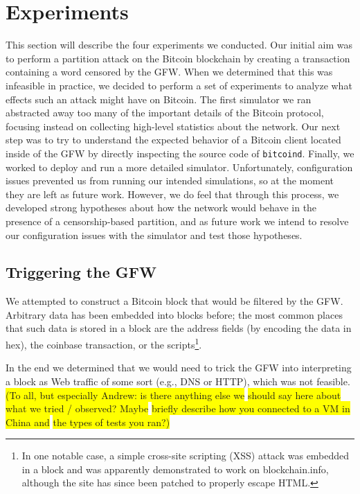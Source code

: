 \section{Experiments}
This section will describe the four experiments we conducted. Our initial aim was to perform a partition attack on the Bitcoin blockchain by creating a transaction containing a word censored by the GFW. When we determined that this was infeasible in practice, we decided to perform a set of experiments to analyze what effects such an attack might have on Bitcoin. The first simulator we ran abstracted away too many of the important details of the Bitcoin protocol, focusing instead on collecting high-level statistics about the network. Our next step was to try to understand the expected behavior of a Bitcoin client located inside of the GFW by directly inspecting the source code of \texttt{bitcoind}. Finally, we worked to deploy and run a more detailed simulator. Unfortunately, configuration issues prevented us from running our intended simulations, so at the moment they are left as future work. However, we do feel that through this process, we developed strong hypotheses about how the network would behave in the presence of a censorship-based partition, and as future work we intend to resolve our configuration issues with the simulator and test those hypotheses.

\subsection{Triggering the GFW}
We attempted to construct a Bitcoin block that would be filtered by the GFW. Arbitrary data has been embedded into blocks before; the most common places that such data is stored in a block are the address fields (by encoding the data in hex), the coinbase transaction, or the scripts\footnote{In one notable case, a simple cross-site scripting (XSS) attack was embedded in a block and was apparently demonstrated to work on blockchain.info\cite{reddit}, although the site has since been patched to properly escape HTML.}. 

In the end we determined that we would need to trick the GFW into interpreting a block as Web traffic of some sort (e.g., DNS or HTTP), which was not feasible.
\colorbox{yellow}{(To all, but especially Andrew: is there anything else we}
\colorbox{yellow}{should say here about what we tried / observed? Maybe}
\colorbox{yellow}{briefly describe how you connected to a VM in China and}
\colorbox{yellow}{the types of tests you ran?)}



